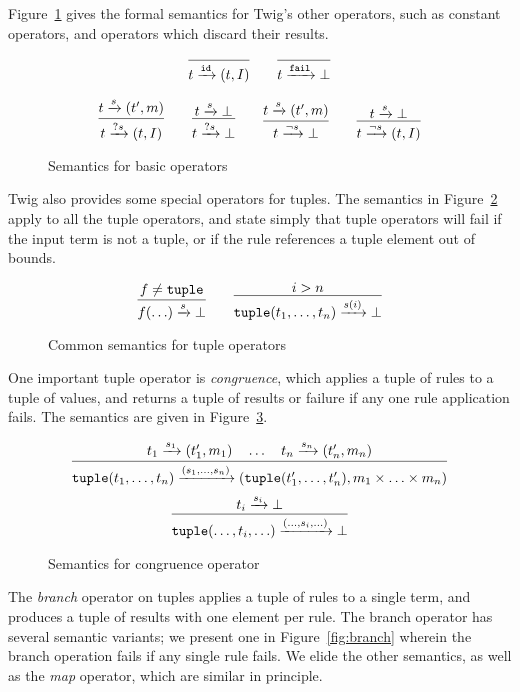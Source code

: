 Figure~\ref{fig:basic} gives the formal semantics for Twig's other operators, such as constant operators, and operators which discard their results.

\begin{figure}[ht]
\label{fig:basic}
\[
\infer
  {t \arr{\mathtt{id}} (t,I)}
  {}
\qquad
\infer
  {t \arr{\mathtt{fail}} \bot}
  {}
\]

\[
\infer
  {t \arr{?s} (t,I)}
  {t \arr{s} (t',m)}
\qquad 
\infer
  {t \arr{?s} \bot}
  {t \arr{s} \bot}
\qquad
\infer
  {t \arr{\lnot s} \bot}
  {t \arr{s} (t',m)}
\qquad 
\infer
  {t \arr{\lnot s} (t,I)}
  {t \arr{s} \bot}
\]
\caption{Semantics for basic operators}
\end{figure}

Twig also provides some special operators for tuples. The semantics in Figure~\ref{fig:all-tuples} apply to all the tuple operators, and state simply that tuple operators will fail if the input term is not a tuple, or if the rule references a tuple element out of bounds.

\begin{figure}[ht]
\label{fig:all-tuples}
\[
\infer
  {f(\ldots) \arr{s} \bot}
  {f \neq \mathtt{tuple}}
\qquad
\infer
  {\mathtt{tuple}(t_1,\ldots,t_n) \arr{s(i)} \bot}
  {i > n}
\]
\caption{Common semantics for tuple operators}
\end{figure}

One important tuple operator is \emph{congruence}, which applies a tuple of rules to a tuple of values, and returns a tuple of results or failure if any one rule application fails. The semantics are given in Figure~\ref{fig:congruence}.

\begin{figure}[ht]
\label{fig:congruence}
\[
\infer
  {\mathtt{tuple}(t_1,\ldots,t_n)\arr{(s_1,\ldots,s_n)} (\mathtt{tuple}(t_1',\ldots,t_n'),m_1 \times \ldots \times m_n) }
  {t_1 \arr{s_1} (t_1',m_1) \quad \ldots \quad t_n \arr{s_n} (t_n',m_n)}
\]
\[
\infer
  {\mathtt{tuple}(\ldots,t_i,\ldots)\arr{(\ldots,s_i,\ldots)}\bot}
  {t_i \arr{s_i} \bot}
\]
\caption{Semantics for congruence operator}
\end{figure}

The \emph{branch} operator on tuples applies a tuple of rules to a single term, and produces a tuple of results with one element per rule. The branch operator has several semantic variants; we present one in Figure~\ref{fig:branch} wherein the branch operation fails if any single rule fails. We elide the other semantics, as well as the \emph{map} operator, which are similar in principle.

